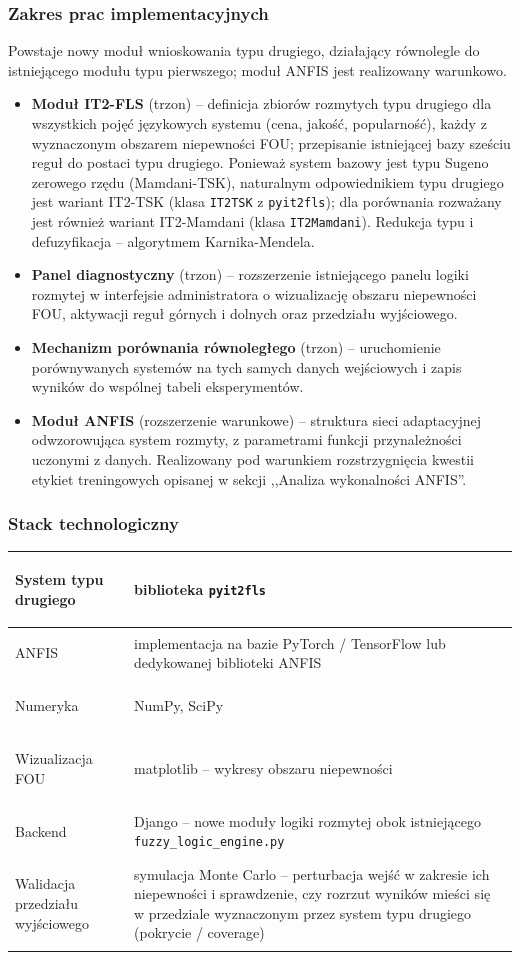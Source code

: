 \documentclass[12pt,a4paper]{article}
\newenvironment{stacktab}{%
    \arrayrulecolor{border}%
    \begin{tabular}{|>{\columncolor{lightbg}\bfseries\color{primary}\raggedright\arraybackslash}p{4.4cm}|>{\raggedright\arraybackslash}p{11.6cm}|}
    \hline
}{%
    \end{tabular}%
    \arrayrulecolor{black}%
}
\newcommand{\stackrow}[2]{#1 & #2 \\ \hline}
\newcommand{\topicsection}[1]{\subsubsection*{#1}}
\begin{document}
\topicsection{Zakres prac implementacyjnych}
Powstaje nowy moduł wnioskowania typu drugiego, działający równolegle do istniejącego modułu typu pierwszego; moduł ANFIS jest realizowany warunkowo.

\begin{itemize}
\item \textbf{Moduł IT2-FLS} (trzon) -- definicja zbiorów rozmytych typu drugiego dla wszystkich pojęć językowych systemu (cena, jakość, popularność), każdy z wyznaczonym obszarem niepewności FOU; przepisanie istniejącej bazy sześciu reguł do postaci typu drugiego. Ponieważ system bazowy jest typu Sugeno zerowego rzędu (Mamdani-TSK), naturalnym odpowiednikiem typu drugiego jest wariant IT2-TSK (klasa \texttt{IT2TSK} z \texttt{pyit2fls}); dla porównania rozważany jest również wariant IT2-Mamdani (klasa \texttt{IT2Mamdani}). Redukcja typu i defuzyfikacja -- algorytmem Karnika-Mendela.
\item \textbf{Panel diagnostyczny} (trzon) -- rozszerzenie istniejącego panelu logiki rozmytej w interfejsie administratora o wizualizację obszaru niepewności FOU, aktywacji reguł górnych i dolnych oraz przedziału wyjściowego.
\item \textbf{Mechanizm porównania równoległego} (trzon) -- uruchomienie porównywanych systemów na tych samych danych wejściowych i zapis wyników do wspólnej tabeli eksperymentów.
\item \textbf{Moduł ANFIS} (rozszerzenie warunkowe) -- struktura sieci adaptacyjnej odwzorowująca system rozmyty, z parametrami funkcji przynależności uczonymi z danych. Realizowany pod warunkiem rozstrzygnięcia kwestii etykiet treningowych opisanej w sekcji ,,Analiza wykonalności ANFIS''.
\end{itemize}

\topicsection{Stack technologiczny}
\begin{stacktab}
\stackrow{System typu drugiego}{biblioteka \texttt{pyit2fls}}
\stackrow{ANFIS}{implementacja na bazie PyTorch / TensorFlow lub dedykowanej biblioteki ANFIS}
\stackrow{Numeryka}{NumPy, SciPy}
\stackrow{Wizualizacja FOU}{matplotlib -- wykresy obszaru niepewności}
\stackrow{Backend}{Django -- nowe moduły logiki rozmytej obok istniejącego \texttt{fuzzy\_logic\_engine.py}}
\stackrow{Walidacja przedziału wyjściowego}{symulacja Monte Carlo -- perturbacja wejść w zakresie ich niepewności i sprawdzenie, czy rozrzut wyników mieści się w przedziale wyznaczonym przez system typu drugiego (pokrycie / coverage)}
\end{stacktab}
\end{document}
